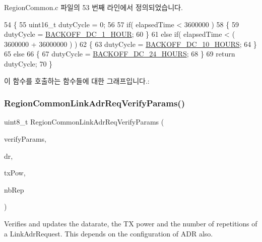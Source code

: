 Region\+Common.\+c 파일의 53 번째 라인에서 정의되었습니다.


\begin{DoxyCode}
54 \{
55     uint16\_t dutyCycle = 0;
56 
57     \textcolor{keywordflow}{if}( elapsedTime < 3600000 )
58     \{
59         dutyCycle = \mbox{\hyperlink{_region_common_8c_a1d58cbd560840cdab3e4427797e88c3a}{BACKOFF\_DC\_1\_HOUR}};
60     \}
61     \textcolor{keywordflow}{else} \textcolor{keywordflow}{if}( elapsedTime < ( 3600000 + 36000000 ) )
62     \{
63         dutyCycle = \mbox{\hyperlink{_region_common_8c_a70461da0dc970b3de51718ab397a81db}{BACKOFF\_DC\_10\_HOURS}};
64     \}
65     \textcolor{keywordflow}{else}
66     \{
67         dutyCycle = \mbox{\hyperlink{_region_common_8c_ada6c3c87744e22f1c053caba7c40d26c}{BACKOFF\_DC\_24\_HOURS}};
68     \}
69     \textcolor{keywordflow}{return} dutyCycle;
70 \}
\end{DoxyCode}
이 함수를 호출하는 함수들에 대한 그래프입니다.\+:
\mbox{\label{group___r_e_g_i_o_n_c_o_m_m_o_n_ga2c87f98f09793dc7fa63a9801feeed73}} 
\subsubsection{\texorpdfstring{Region\+Common\+Link\+Adr\+Req\+Verify\+Params()}{RegionCommonLinkAdrReqVerifyParams()}}
{\footnotesize\ttfamily uint8\+\_\+t Region\+Common\+Link\+Adr\+Req\+Verify\+Params (\begin{DoxyParamCaption}\item[{\mbox{\hyperlink{group___r_e_g_i_o_n_c_o_m_m_o_n_gad186afbaf1b52893ddc3fa5eba88de0a}{Region\+Common\+Link\+Adr\+Req\+Verify\+Params\+\_\+t}} $\ast$}]{verify\+Params,  }\item[{int8\+\_\+t $\ast$}]{dr,  }\item[{int8\+\_\+t $\ast$}]{tx\+Pow,  }\item[{uint8\+\_\+t $\ast$}]{nb\+Rep }\end{DoxyParamCaption})}



Verifies and updates the datarate, the TX power and the number of repetitions of a Link\+Adr\+Request. This depends on the configuration of A\+DR also. 



